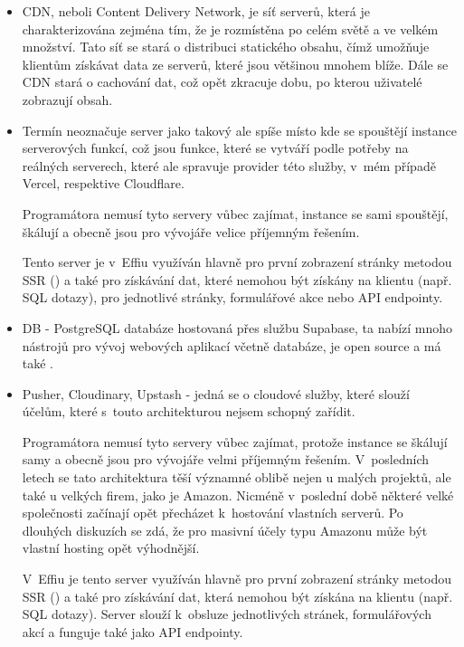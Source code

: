 \documentclass[12pt, a4paper,
openright
]{report}
\begin{document}
	\begin{itemize}
		\item CDN, neboli Content Delivery Network, je síť serverů, která je charakterizována zejména tím, že je rozmístěna po celém světě a ve velkém množství. Tato síť se stará o distribuci statického obsahu, čímž umožňuje klientům získávat data ze serverů, které jsou většinou mnohem blíže. Dále se CDN stará o cachování dat, což opět zkracuje dobu, po kterou uživatelé zobrazují obsah.
		\item Termín  neoznačuje server jako takový ale spíše místo kde se spouštějí instance serverových funkcí, což jsou funkce, které se vytváří podle potřeby na reálných serverech, které ale spravuje provider této služby, v~mém případě Vercel, respektive Cloudflare.
		
		Programátora nemusí tyto servery vůbec zajímat, instance se sami spouštějí, škálují a obecně jsou pro vývojáře velice příjemným řešením.
		
		Tento server je v~Effiu využíván hlavně pro první zobrazení stránky metodou SSR () a také pro získávání dat, které nemohou být získány na klientu (např. SQL dotazy), pro jednotlivé stránky, formulářové akce nebo API endpointy.
		
		\item DB - PostgreSQL databáze hostovaná přes službu Supabase, ta nabízí mnoho nástrojů pro vývoj webových aplikací včetně databáze, je open source a má také .
		\item Pusher, Cloudinary, Upstash - jedná se o cloudové služby, které slouží účelům, které s~touto architekturou nejsem schopný zařídit.

		Programátora nemusí tyto servery vůbec zajímat, protože instance se škálují samy a obecně jsou pro vývojáře velmi příjemným řešením. V~posledních letech se tato architektura těší významné oblibě nejen u malých projektů, ale také u velkých firem, jako je Amazon. Nicméně v~poslední době některé velké společnosti začínají opět přecházet k~hostování vlastních serverů. Po dlouhých diskuzích se zdá, že pro masivní účely typu Amazonu může být vlastní hosting opět výhodnější.
		
		V~Effiu je tento server využíván hlavně pro první zobrazení stránky metodou SSR () a také pro získávání dat, která nemohou být získána na klientu (např. SQL dotazy). Server slouží k~obsluze jednotlivých stránek, formulářových akcí a funguje také jako API endpointy.
		

\end{itemize}
\end{document}
